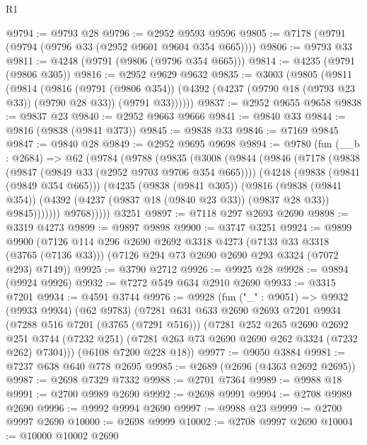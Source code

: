 \begin{lexlean}{R1}
\begin{coremodule}
@9794 := @9793 @28
@9796 := @2952 @9593 @9596
@9805 := @7178 (@9791 (@9794 (@9796 @33 (@2952 @9601 @9604 @354 @665))))
@9806 := @9793 @33
@9811 := @4248 (@9791 (@9806 (@9796 @354 @665)))
@9814 := @4235 (@9791 (@9806 @305))
@9816 := @2952 @9629 @9632
@9835 := @3003
    (@9805
      (@9811
        (@9814
          (@9816
            (@9791 (@9806 @354))
            (@4392 (@4237 (@9790 @18 (@9793 @23 @33)) (@9790 @28 @33)) (@9791 @33))))))
@9837 := @2952 @9655 @9658
@9838 := @9837 @23
@9840 := @2952 @9663 @9666
@9841 := @9840 @33
@9844 := @9816 (@9838 (@9841 @373))
@9845 := @9838 @33
@9846 := @7169 @9845
@9847 := @9840 @28
@9849 := @2952 @9695 @9698
@9894 := @9780
    (fun (__b : @2684) =>
    @62
      (@9784
        (@9788
          (@9835
            (@3008
              (@9844
                (@9846
                  (@7178
                    (@9838 (@9847 (@9849 @33 (@2952 @9703 @9706 @354 @665))))
                    (@4248
                      (@9838 (@9841 (@9849 @354 @665)))
                      (@4235
                        (@9838 (@9841 @305))
                        (@9816
                          (@9838 (@9841 @354))
                          (@4392 (@4237 (@9837 @18 (@9840 @23 @33)) (@9837 @28 @33)) @9845)))))))
              @9768)))))
    @3251
@9897 := @7118 @297 @2693 @2690
@9898 := @3319 @4273
@9899 := @9897 @9898
@9900 := @3747 @3251
@9924 := @9899
    @9900
    (@7126
      @114
      @296
      @2690
      @2692
      @3318
      @4273
      (@7133 @33 @3318 (@3765 (@7136 @33)))
      (@7126 @294 @73 @2690 @2690 @293 @3324 (@7072 @293) @7149))
@9925 := @3790 @2712
@9926 := @9925 @28
@9928 := @9894 (@9924 @9926)
@9932 := @7272 @549 @634 @2910 @2690
@9933 := @3315 @7201
@9934 := @4591 @3744
@9976 := @9928
    (fun ("_" : @9051) =>
    @9932
      (@9933 @9934)
      (@62 @9783)
      (@7281
        @631
        @633
        @2690
        @2693
        @7201
        @9934
        (@7288 @516 @7201 (@3765 (@7291 @516)))
        (@7281
          @252
          @265
          @2690
          @2692
          @251
          @3744
          (@7232 @251)
          (@7281 @263 @73 @2690 @2690 @262 @3324 (@7232 @262) @7304)))
      (@6108 @7200 @228 @18))
@9977 := @9050 @3884
@9981 := @7237 @638 @640 @778 @2695
@9985 := @2689 (@2696 (@4363 @2692 @2695))
@9987 := @2698 @7329 @7332
@9988 := @2701 @7364
@9989 := @9988 @18
@9991 := @2700 @9989 @2690
@9992 := @2698 @9991
@9994 := @2708 @9989 @2690
@9996 := @9992 @9994 @2690
@9997 := @9988 @23
@9999 := @2700 @9997 @2690
@10000 := @2698 @9999
@10002 := @2708 @9997 @2690
@10004 := @10000 @10002 @2690

\end{coremodule}
\end{lexlean}
